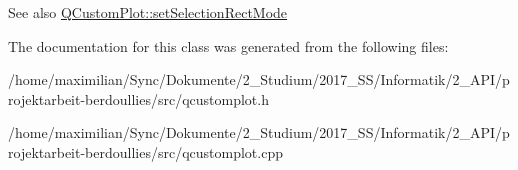 \begin{DoxySeeAlso}{See also}
\hyperlink{class_q_custom_plot_a810ef958ebe84db661c7288b526c0deb}{Q\+Custom\+Plot\+::set\+Selection\+Rect\+Mode} 
\end{DoxySeeAlso}


The documentation for this class was generated from the following files\+:\begin{DoxyCompactItemize}
\item 
/home/maximilian/\+Sync/\+Dokumente/2\+\_\+\+Studium/2017\+\_\+\+S\+S/\+Informatik/2\+\_\+\+A\+P\+I/projektarbeit-\/berdoullies/src/qcustomplot.\+h\item 
/home/maximilian/\+Sync/\+Dokumente/2\+\_\+\+Studium/2017\+\_\+\+S\+S/\+Informatik/2\+\_\+\+A\+P\+I/projektarbeit-\/berdoullies/src/qcustomplot.\+cpp\end{DoxyCompactItemize}
